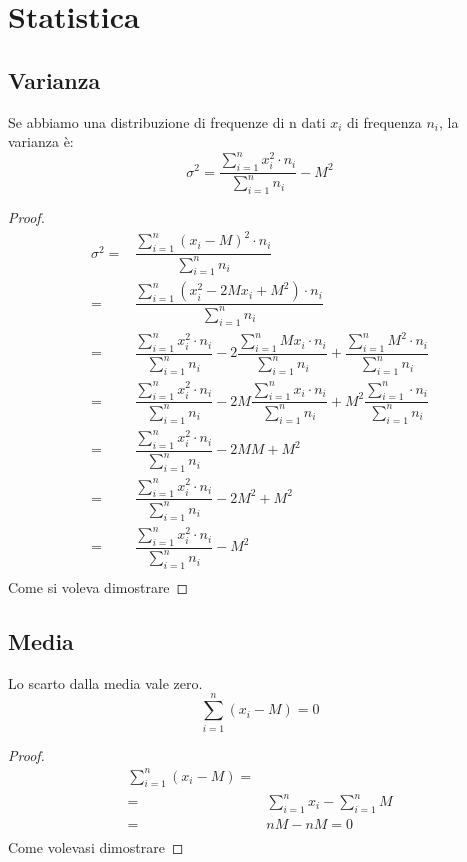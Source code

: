 \chapter{Statistica}
\section{Varianza}
\begin{thm}[Varianza]
	Se abbiamo una distribuzione di frequenze di n dati  $x_{i}$ di frequenza $n_{i}$, la varianza è: \[\sigma^{2}=\dfrac{\sum_{i=1}^{n}x_{i}^{2}\cdot n_{i}}{\sum_{i=1}^{n} n_{i}}-M^2\] 
\end{thm}
\begin{proof}
	\begin{align*}
	\sigma^{2}=&\dfrac{\sum_{i=1}^{n}(x_{i}-M)^{2}\cdot n_{i}}{\sum_{i=1}^{n} n_{i}}\\
	=&\dfrac{\sum_{i=1}^{n}(x_{i}^{2} -2Mx_{i}+M^{2})\cdot n_{i}}{\sum_{i=1}^{n} n_{i}}\\
	=&\dfrac{\sum_{i=1}^{n}x_{i}^{2}\cdot n_{i}}{\sum_{i=1}^{n} n_{i}}-2 \dfrac{\sum_{i=1}^{n}Mx_{i}\cdot n_{i}}{\sum_{i=1}^{n} n_{i}} +\dfrac{\sum_{i=1}^{n}M^{2}\cdot n_{i}}{\sum_{i=1}^{n} n_{i}}\\
	=&\dfrac{\sum_{i=1}^{n}x_{i}^{2}\cdot n_{i}}{\sum_{i=1}^{n} n_{i}}-2M \dfrac{\sum_{i=1}^{n}x_{i}\cdot n_{i}}{\sum_{i=1}^{n} n_{i}} +M^{2}\dfrac{\sum_{i=1}^{n}\cdot n_{i}}{\sum_{i=1}^{n} n_{i}}\\
	=&\dfrac{\sum_{i=1}^{n}x_{i}^{2}\cdot n_{i}}{\sum_{i=1}^{n} n_{i}}-2MM +M^{2}\\
	=&\dfrac{\sum_{i=1}^{n}x_{i}^{2}\cdot n_{i}}{\sum_{i=1}^{n} n_{i}}-2M^{2} +M^{2}\\
	=&\dfrac{\sum_{i=1}^{n}x_{i}^{2}\cdot n_{i}}{\sum_{i=1}^{n} n_{i}}-M^{2}\\
	\end{align*}
	Come si voleva dimostrare
\end{proof}
\section{Media}
\begin{thm}
	Lo scarto dalla media vale zero.\[\sum_{i=1}^{n}(x_{i}-M)=0\] 
\end{thm}
\begin{proof}
	\begin{align*}
	\sum_{i=1}^{n}(x_{i}-M)=&\\
	=&\sum_{i=1}^{n}x_{i}-\sum_{i=1}^{n}M\\
	=&nM-nM=0\\
	\end{align*}
	Come volevasi dimostrare
\end{proof}